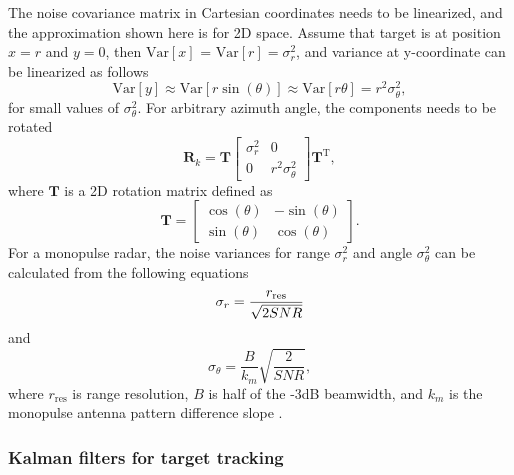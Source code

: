 \documentclass[english, 12pt, a4paper, elec, utf8, a-1b, online]{aaltothesis}
\renewcommand{\vec}[1]{\mathbf{#1}}
\newcommand{\ocov}{\vec{R}_k}
\newcommand{\transpose}[1]{#1^\text{T}}
\newcommand{\rotmat}{\mathbf{T}}
\newcommand{\Var}[1]{\text{Var}\left[ #1 \right]}
\begin{document}
The noise covariance matrix in Cartesian coordinates needs to be linearized, and the approximation shown here is for 2D space.
Assume that target is at position $x=r$ and $y=0$, then $\Var{x}$ = $\Var{r} = \sigma_r^2$, and variance at y-coordinate can be linearized as follows
\begin{equation*}
    \Var{y} \approx \Var{r \sin\left(\theta\right)} \approx \Var{r \theta} = r^2\sigma_\theta^2,
\end{equation*} 
for small values of $\sigma_\theta^2$.
For arbitrary azimuth angle, the components needs to be rotated
\begin{equation} \label{eq:cartesian_measurement_covariance}
    \ocov = \rotmat 
    \left[
        \begin{array}{cc}
            \sigma_r^2 & 0 \\
            0 & r^2 \sigma_\theta^2
        \end{array}
    \right] 
    \transpose{\rotmat},
\end{equation}
where $\rotmat$ is a 2D rotation matrix defined as
\begin{equation}
    \rotmat = \left[
        \begin{array}{cc}
            \cos(\theta) & -\sin(\theta) \\
            \sin(\theta) & \cos(\theta)
        \end{array}
    \right].
\end{equation}
For a monopulse radar, the noise variances for range $\sigma_r^2$ and angle $\sigma_\theta^2$ can be calculated from the following equations
\begin{equation}
    \sigma_r =  \frac{r_\text{res}}{\sqrt{2 SNR}}  \label{eq:sigma_r}\\
\end{equation}
and
\begin{equation}
    \sigma_\theta =  \frac{B}{k_m} \sqrt{\frac{2}{SNR}} \label{eq:sigma_theta},
\end{equation}
where $r_\text{res}$ is range resolution, $B$ is half of the -3dB beamwidth, and $k_m$ is the monopulse antenna pattern difference slope \cite{Curry2011}.

\subsubsection{Kalman filters for target tracking} \label{sec:kalman_filter}
\end{document}
